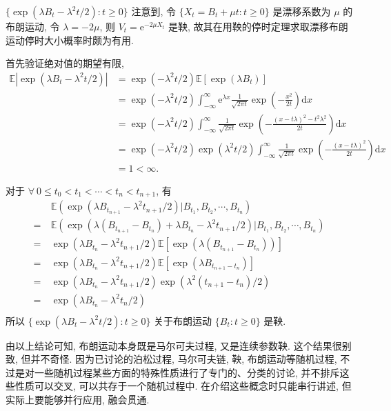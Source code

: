 \documentclass[openany]{ctexbook}
\theoremstyle{kaiti}
\theoremstyle{normal}
\begin{document}
$\{\exp(\lambda B_t-\lambda^2t/2):t\geqslant0\}$
注意到, 令 $\{X_t=B_t+\mu t:t\geqslant0\}$ 是漂移系数为 $\mu$ 的布朗运动, 令 $\lambda=-2\mu$, 则 $V_t=\mathrm{e}^{-2\mu X_t}$ 是鞅, 故其在用鞅的停时定理求取漂移布朗运动停时大小概率时颇为有用.

首先验证绝对值的期望有限,
\begin{equation}
  \begin{aligned}
    \mathbb{E}|\exp(\lambda B_t-\lambda^2t/2)|
    &=\exp(-\lambda^2t/2)\mathbb{E}[\exp(\lambda B_t)]\\
    &=\exp(-\lambda^2t/2)\int_{-\infty}^\infty\mathrm{e}^{\lambda x}\frac{1}{\sqrt{2\pi t}}\exp\left(-\frac{x^2}{2t}\right)\mathrm{d}x\\
    &=\exp(-\lambda^2t/2)\int_{-\infty}^\infty\frac{1}{\sqrt{2\pi t}}\exp\left(-\frac{(x-t\lambda)^2-t^2\lambda^2}{2t}\right)\mathrm{d}x\\
    &=\exp(-\lambda^2t/2)\exp(\lambda^2t/2)\int_{-\infty}^\infty\frac{1}{\sqrt{2\pi t}}\exp\left(-\frac{(x-t\lambda)^2}{2t}\right)\mathrm{d}x\\
    &=1<\infty.
  \end{aligned}
\end{equation}

对于 $\forall~0\leqslant t_0<t_1<\cdots<t_n<t_{n+1}$, 有
\begin{equation}
  \begin{aligned}
    &~\mathbb{E}(\exp(\lambda B_{t_{n+1}}-\lambda^2t_{n+1}/2)\big|B_{t_1},B_{t_2},\cdots,B_{t_n})\\
    =&~\mathbb{E}(\exp(\lambda(B_{t_{n+1}}-B_{t_n})+\lambda B_{t_n}-\lambda^2t_{n+1}/2)\big|B_{t_1},B_{t_2},\cdots,B_{t_n})\\
    =&~\exp(\lambda B_{t_n}-\lambda^2t_{n+1}/2)\mathbb{E}[\exp(\lambda(B_{t_{n+1}}-B_{t_n}))]\\
    =&~\exp(\lambda B_{t_n}-\lambda^2t_{n+1}/2)\mathbb{E}[\exp(\lambda B_{t_{n+1}-t_n})]\\
    =&~\exp(\lambda B_{t_n}-\lambda^2t_{n+1}/2)\exp(\lambda^2({t_{n+1}-t_n})/2)\\
    =&~\exp(\lambda B_{t_n}-\lambda^2t_{n}/2)\\
  \end{aligned}
\end{equation}
所以 $\{\exp(\lambda B_t-\lambda^2t/2):t\geqslant0\}$ 关于布朗运动 $\{B_t:t\geqslant0\}$ 是鞅.

由以上结论可知, 布朗运动本身既是马尔可夫过程, 又是连续参数鞅. 这个结果很别致, 但并不奇怪. 因为已讨论的泊松过程, 马尔可夫链, 鞅, 布朗运动等随机过程, 不过是对一些随机过程某些方面的特殊性质进行了专门的、分类的讨论, 并不排斥这些性质可以交叉, 可以共存于一个随机过程中. 在介绍这些概念时只能串行讲述, 但实际上要能够并行应用, 融会贯通.
\end{document}
